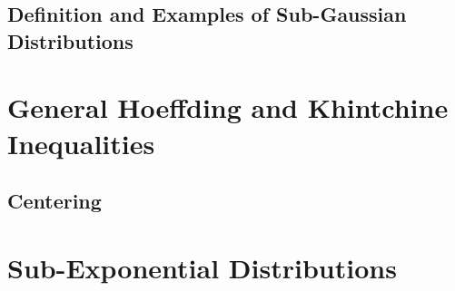 \documentclass{report}
\theoremstyle{definition}
\newenvironment{exercise}[1]{
  \renewcommand\theexerciseimpl{#1}
  \exerciseimpl
}{\endexerciseimpl}
\begin{document}
\subsection{Definition and Examples of Sub-Gaussian Distributions}

\begin{exercise}{2.5.7}
\end{exercise}

\begin{exercise}{2.5.9}
\end{exercise}

\begin{exercise}{2.5.10}
\end{exercise}

\begin{exercise}{2.5.11}
\end{exercise}

\section{General Hoeffding and Khintchine Inequalities}

\begin{exercise}{2.6.4}
\end{exercise}

\begin{exercise}{2.6.5}
\end{exercise}

\begin{exercise}{2.6.6}
\end{exercise}

\begin{exercise}{2.6.7}
\end{exercise}

\subsection{Centering}

\begin{exercise}{2.6.9}
\end{exercise}

\section{Sub-Exponential Distributions}

\begin{exercise}{2.7.2}
\end{exercise}

\begin{exercise}{2.7.3}
\end{exercise}
\end{document}
